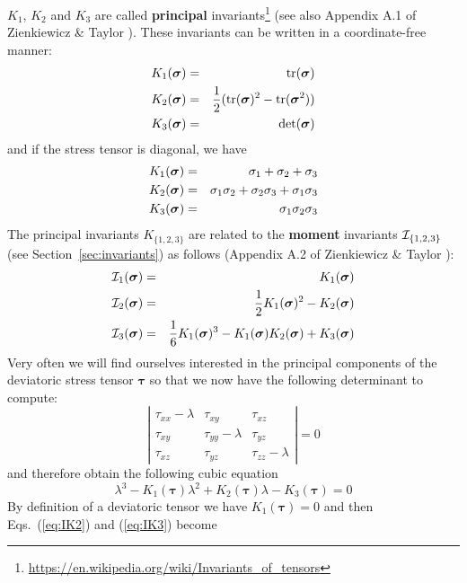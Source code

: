 \noindent $K_1$, $K_2$ and $K_3$ are called {\bf principal}
invariants\footnote{\url{https://en.wikipedia.org/wiki/Invariants_of_tensors}} 
(see also Appendix A.1 of Zienkiewicz \& Taylor \cite{zita2}). 
These invariants can be written in a coordinate-free manner:
\begin{eqnarray}
K_1({\bm \sigma}) &=& {\rm tr}({\bm \sigma})  \nonumber\\
K_2({\bm \sigma}) &=& \frac{1}{2}(  {\rm tr}({\bm \sigma}) ^2 - {\rm tr}({\bm \sigma}^2)  ) \nonumber\\
K_3({\bm \sigma}) &=& \det ({\bm \sigma}) \nonumber
\end{eqnarray}
and if the stress tensor is diagonal, we have
\begin{eqnarray}
K_1({\bm \sigma}) &=& \sigma_{1}+\sigma_{2}+\sigma_{3}\nonumber\\
K_2({\bm \sigma}) &=& \sigma_{1}\sigma_{2}+\sigma_{2}\sigma_{3}+\sigma_{1}\sigma_{3} \nonumber\\
K_3({\bm \sigma}) &=& \sigma_1\sigma_2\sigma_3 \nonumber
\end{eqnarray}
The principal invariants $K_{\{1,2,3\}}$ are related to the {\bf moment} invariants ${\cal I}_{\{1,2,3\}}$ 
(see Section~\ref{sec:invariants}) as follows (Appendix A.2 of Zienkiewicz \& Taylor \cite{zita2}):
\begin{eqnarray}
{\cal I}_1({\bm \sigma})&=& K_1({\bm \sigma}) \\ 
{\cal I}_2({\bm \sigma})&=& \frac{1}{2}K_1({\bm \sigma})^2 -K_2({\bm \sigma}) \label{eq:IK2}\\
{\cal I}_3({\bm \sigma})&=& \frac{1}{6}K_1({\bm \sigma})^3 -K_1({\bm \sigma}) K_2({\bm \sigma}) +K_3({\bm \sigma}) \label{eq:IK3}
\end{eqnarray}
Very often we will find ourselves interested in the principal components 
of the deviatoric stress tensor $\bm \tau$ so that we now have the following determinant to compute:
\[
\left|  
\begin{array}{ccc}
\tau_{xx}-\lambda & \tau_{xy} & \tau_{xz} \\
\tau_{xy} & \tau_{yy}-\lambda & \tau_{yz} \\
\tau_{xz} & \tau_{yz} & \tau_{zz} -\lambda
\end{array}
\right|
=0
\]
and therefore obtain the following cubic equation
\begin{equation}
\lambda^3 - K_1({\bm \tau}) \lambda^2 + K_2({\bm \tau}) \lambda -K_3({\bm \tau})=0
\end{equation}
By definition of a deviatoric tensor we have $K_1({\bm \tau})=0$ and then Eqs.~(\ref{eq:IK2}) and (\ref{eq:IK3}) become
